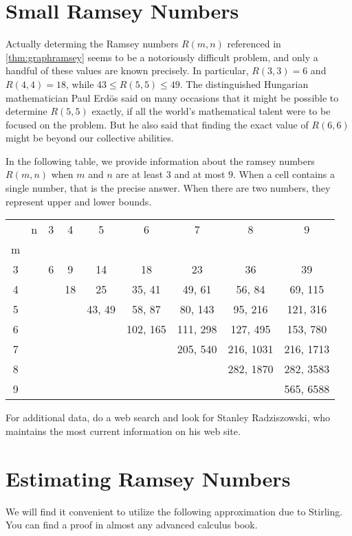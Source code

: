 \section{Small Ramsey Numbers}\label{s:size}

Actually determing the Ramsey numbers $R(m,n)$ referenced in \autoref{thm:graphramsey}
seems to be a notoriously difficult problem, and only a handful of these
values are known precisely.  In particular, $R(3,3)=6$ and $R(4,4)=18$, while
$43\le R(5,5)\le 49$.  The distinguished Hungarian mathematician
Paul Erd\"os said on many occasions that it might be possible
to determine $R(5,5)$ exactly, if all the world's mathematical
talent were to be focused on the problem.  But he also said that
finding the exact value of $R(6,6)$ might be beyond our collective
abilities.

In the following table, we provide information about
the ramsey numbers $R(m,n)$ when $m$ and $n$ are at least $3$ and at
most $9$.   When a cell contains a single number, that
is the precise answer.  When there are two numbers, they
represent upper and lower bounds.

\begin{center}
\begin{tabular}{||cc||c|c|c|c|c|c|c||}
\hline\hline
&n&3&4&5&6&7&8&9\\
m&&&&&&&&\\
\hline\hline
3&&6&9&14&18&23&36&39\\
4&&&18&25&35, 41&49, 61&56, 84&69, 115\\
5&&&&43, 49&58, 87&80, 143&95, 216&121, 316\\
6&&&&&102, 165&111, 298&127, 495&153, 780\\
7&&&&&&205, 540&216, 1031&216, 1713\\
8&&&&&&&282, 1870&282, 3583\\
9&&&&&&&&565, 6588\\
\hline\hline
\end{tabular}
\end{center}

For additional data, do a web search and look for
Stanley Radziszowski, who maintains the most current information
on his web site.

\section{Estimating Ramsey Numbers}\label{s:estimatesize}

We will find it convenient to utilize the following approximation
due to Stirling.  You can find a proof in almost any
advanced calculus book.

